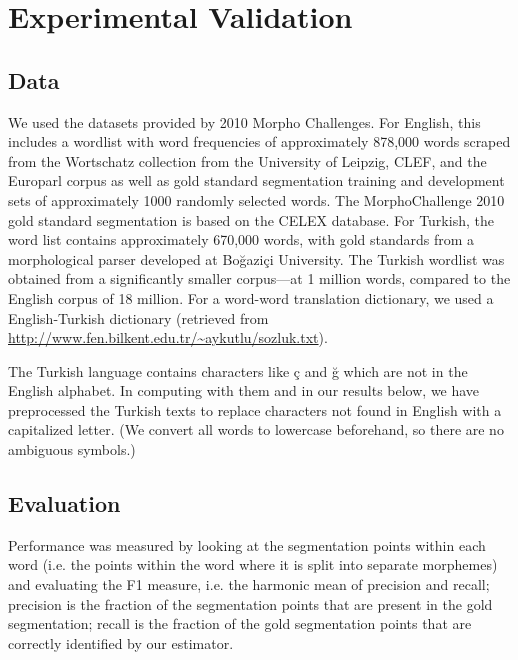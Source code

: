 \documentclass[11pt,twocolumn]{article}
\begin{document}
\section{Experimental Validation}

\subsection{Data}

We used the datasets provided by 2010 Morpho Challenges. For English, this includes
a wordlist with word frequencies of approximately 878,000 words scraped from the
Wortschatz collection from the University of Leipzig, CLEF, and the Europarl corpus
as well as gold standard segmentation training and development sets of approximately 
1000 randomly selected words. The MorphoChallenge 2010 gold standard segmentation is based on the CELEX database.
For Turkish, the word list contains approximately 670,000 words, with gold standards
from a morphological parser developed at Boğaziçi University. The Turkish wordlist
was obtained from a significantly smaller corpus---at 1 million words, compared
to the English corpus of 18 million.
For a word-word translation dictionary, we used a English-Turkish dictionary
(retrieved from \url{http://www.fen.bilkent.edu.tr/~aykutlu/sozluk.txt}).


The Turkish language contains characters like \c{c} and \u{g} which are not in the English alphabet. In computing with them and in our results below, we have preprocessed the Turkish texts to replace characters not found in English with a capitalized letter. (We convert all words to lowercase beforehand, so there are no ambiguous symbols.)

\subsection{Evaluation}
Performance was measured by looking at the segmentation points within each word
(i.e. the points within the word where it is split into separate morphemes)
and evaluating the F1 measure, i.e. the harmonic mean of precision and recall;
precision is the fraction of the segmentation points that are present
in the gold segmentation; recall is the fraction of the gold segmentation points
that are correctly identified by our estimator.
\end{document}
